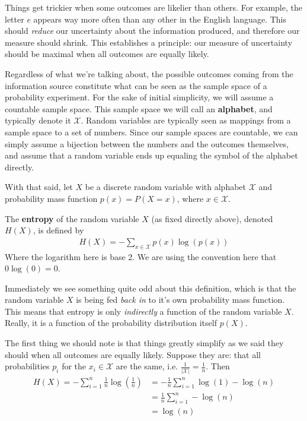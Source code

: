Things get trickier when some outcomes are likelier than others. For example, the letter $e$ appears way more often than any other in the English language. This should \emph{reduce} our uncertainty about the information produced, and therefore our measure should shrink. This establishes a principle: our measure of uncertainty should be maximal when all outcomes are equally likely. \par  Regardless of what we're talking about, the possible outcomes coming from the information source constitute what can be seen as the sample space of a probability experiment. For the sake of initial simplicity, we will assume a countable sample space. This sample space we will call an \textbf{alphabet}, and typically denote it $\mathcal{X}$. Random variables are typically seen as mappings from a sample space to a set of numbers. Since our sample spaces are countable, we can simply assume a bijection between the numbers and the outcomes themselves, and assume that a random variable ends up equaling the symbol of the alphabet directly. \par 
With that said, let $X$ be a discrete random variable with alphabet $\mathcal{X}$ and probability mass function $p(x)=P(X = x)$, where $x \in \mathcal{X}$. 
\begin{definition}
	The \textbf{entropy} of the random variable $X$ (as fixed directly above), denoted $H(X)$, is defined by
	\begin{align}
		H(X) = -\sum_{x \in \mathcal{X}}p(x)\log(p(x))
	\end{align}
Where the logarithm here is base 2. We are using the convention here that $0\log(0) = 0$.  
\end{definition}
Immediately we see something quite odd about this definition, which is that the random variable $X$ is being fed \emph{back in} to it's own probability mass function. This means that entropy is only \emph{indirectly} a function of the random variable $X$. Really, it is a function of the probability distribution itself $p(X)$. \par 
The first thing we should note is that things greatly simplify as we said they should when all outcomes are equally likely. Suppose they are: that all probabilities $p_i$ for the $x_i \in \mathcal{X}$ are the same, i.e. $\frac{1}{|\mathcal{X}|} = \frac{1}{n}$. Then 
\begin{align*}
	H(X) = -\sum_{i=1}^n \frac{1}{n}\log(\frac{1}{n}) &= -\frac{1}{n}\sum_{i=1}^n \log(1)-\log(n) \\
		&= \frac{1}{n} \sum_{i=1}^n -\log(n) \\
		&= \log(n)
\end{align*}
